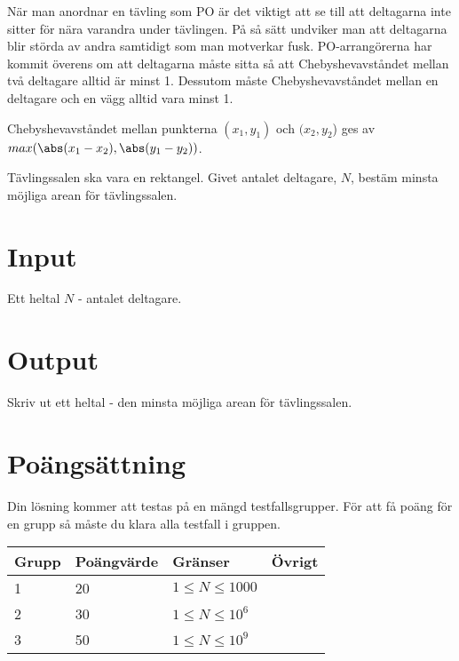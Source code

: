 När man anordnar en tävling som PO är det viktigt att se till att deltagarna inte sitter för nära varandra under tävlingen. På så sätt undviker man att deltagarna blir störda av andra samtidigt som man motverkar fusk. PO-arrangörerna har kommit överens om att deltagarna måste sitta så att Chebyshevavståndet mellan två deltagare alltid är minst 1. Dessutom måste Chebyshevavståndet mellan en deltagare och en vägg alltid vara minst 1. 

Chebyshevavståndet mellan punkterna $(x_1, y_1)$ och $(x_2, y_2$) ges av
$max( \abs(x_1 - x_2), \abs(y_1 - y_2) )$.

Tävlingssalen ska vara en rektangel. Givet antalet deltagare, $N$, bestäm minsta möjliga arean för tävlingssalen.

\section*{Input}
Ett heltal $N$ - antalet deltagare.

\section*{Output}
Skriv ut ett heltal - den minsta möjliga arean för tävlingssalen.

\section*{Poängsättning}
Din lösning kommer att testas på en mängd testfallsgrupper. För att få poäng för en grupp så måste du klara alla testfall i gruppen.

\begin{tabular}{| l | l | l | l |}
\hline
Grupp & Poängvärde & Gränser & Övrigt\\ \hline
1     & 20         & $ 1 \le N \le 1000 $ & \\ \hline
2     & 30         & $ 1 \le N \le 10^6 $ & \\ \hline
3     & 50         & $ 1 \le N \le 10^9 $ & \\ \hline
\end{tabular}
